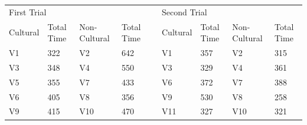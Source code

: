     \begin{table}[ht]
    \begin{tabular}{lllllllll}
    \multicolumn{2}{l}{First Trial}                                   &                                &                                 &                       & \multicolumn{2}{l}{Second Trial}                                 &                                &                                 \\ \cline{2-2} \cline{4-4} \cline{7-7} \cline{9-9} 
    \multicolumn{1}{l|}{Cultural}           & \multicolumn{1}{l|}{Total Time} & \multicolumn{1}{l|}{Non-Cultural}          & \multicolumn{1}{l|}{Total Time} &                       & \multicolumn{1}{l|}{Cultural}          & \multicolumn{1}{l|}{Total Time} & \multicolumn{1}{l|}{Non-Cultural}          & \multicolumn{1}{l|}{Total Time} \\ \cline{1-4} \cline{6-9} 
    \multicolumn{1}{|l|}{V1}        & \multicolumn{1}{l|}{322}        & \multicolumn{1}{l|}{V2}        & \multicolumn{1}{l|}{642}        & \multicolumn{1}{l|}{} & \multicolumn{1}{l|}{V1}        & \multicolumn{1}{l|}{357}        & \multicolumn{1}{l|}{V2}        & \multicolumn{1}{l|}{315}        \\ \cline{1-4} \cline{6-9} 
    \multicolumn{1}{|l|}{V3}        & \multicolumn{1}{l|}{348}        & \multicolumn{1}{l|}{V4}        & \multicolumn{1}{l|}{550}        & \multicolumn{1}{l|}{} & \multicolumn{1}{l|}{V3}        & \multicolumn{1}{l|}{329}        & \multicolumn{1}{l|}{V4}        & \multicolumn{1}{l|}{361}        \\ \cline{1-4} \cline{6-9} 
    \multicolumn{1}{|l|}{V5}        & \multicolumn{1}{l|}{355}        & \multicolumn{1}{l|}{V7}        & \multicolumn{1}{l|}{433}        & \multicolumn{1}{l|}{} & \multicolumn{1}{l|}{V6}        & \multicolumn{1}{l|}{372}        & \multicolumn{1}{l|}{V7}        & \multicolumn{1}{l|}{388}        \\ \cline{1-4} \cline{6-9} 
    \multicolumn{1}{|l|}{V6}        & \multicolumn{1}{l|}{405}        & \multicolumn{1}{l|}{V8}        & \multicolumn{1}{l|}{356}        & \multicolumn{1}{l|}{} & \multicolumn{1}{l|}{V9}        & \multicolumn{1}{l|}{530}        & \multicolumn{1}{l|}{V8}        & \multicolumn{1}{l|}{258}        \\ \cline{1-4} \cline{6-9} 
    \multicolumn{1}{|l|}{V9}        & \multicolumn{1}{l|}{415}        & \multicolumn{1}{l|}{V10}       & \multicolumn{1}{l|}{470}        & \multicolumn{1}{l|}{} & \multicolumn{1}{l|}{V11}       & \multicolumn{1}{l|}{327}        & \multicolumn{1}{l|}{V10}       & \multicolumn{1}{l|}{321}        \\ \cline{1-4} \cline{6-9} 

\end{tabular}
\end{table}
